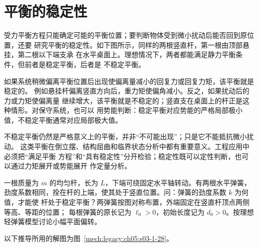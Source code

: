{\section{平衡的稳定性}

受力平衡方程只能确定可能的平衡位置；要判断物体受到微小扰动后能否回到原位置，还要
研究平衡的稳定性。如下图所示，同样的两根竖直杆，第一根由顶部悬挂，第二根以下端支承
在水平桌面上。理想情况下，两者都能满足静力平衡条件，但前者是稳定平衡，后者是
不稳定平衡。

\label{ch05:fig:s03-1-4}

如果系统稍微偏离平衡位置后出现使偏离量减小的回复力或回复力矩，该平衡就是稳定的。
例如悬挂杆偏离竖直方向后，重力矩使偏角减小。反之，如果扰动后的力或力矩使偏离量
继续增大，该平衡就是不稳定的；竖直支在桌面上的杆正是这种情形。对保守系统，也可以
用势能判断：稳定平衡对应势能的严格局部极小值，不稳定平衡通常对应局部极大值。

不稳定平衡仍然是严格意义上的平衡，并非“不可能出现”；只是它不能抵抗微小扰动。
这类平衡在倒立摆、结构屈曲和临界状态分析中都有重要意义。工程应用中必须把“满足平衡
方程”和“具有稳定性”分开检验；稳定性既可以定性判断，也可以通过力矩展开或势能展开
作定量分析。

\begin{origexamplebox}{}\label{ch05:ex:s03-1-28}
一根质量为 $m$ 的均匀杆，长为 $L$，下端可绕固定水平轴转动。有两根水平弹簧，
劲度系数相同，拴在杆的上端，使其处于竖直位置。问：弹簧的劲度系数 $k$ 为何值，才能使
杆处于稳定平衡？两弹簧按图对称布置，外端固定在竖直杆顶点两侧等高、等距的位置；
每根弹簧的原长记为 $\ell_0>0$，初始长度记为 $d_0>0$。按理想轻弹簧模型讨论小幅平面偏转。
\end{origexamplebox}

\begin{xesolution}
以下推导所用的解图为图~\ref{mech:legacy:ch05:s03-1-28}。


\end{xesolution}}
